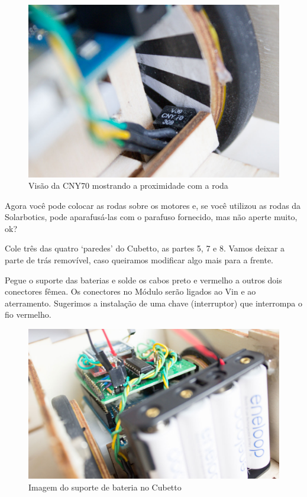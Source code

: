 \documentclass[paper=a4, fontsize=11pt]{scrartcl} %
\numberwithin{equation}{section} %
\numberwithin{figure}{section} %
\numberwithin{table}{section} %
\begin{document}
\begin{figure}[H] %
  \centering
  \includegraphics[scale=0.10]{./imagens/diy-docs-10.jpg}
  \caption[ ]{Visão da CNY70 mostrando a proximidade com a roda }
  \label{fig:cny70 no cubetto perto}
\end{figure}

Agora você pode colocar as rodas sobre os motores e, se você utilizou as rodas da Solarbotics, pode aparafusá-las com o parafuso fornecido, mas não aperte muito, ok?

Cole três das quatro ‘paredes' do Cubetto, as partes 5, 7 e 8. Vamos deixar a parte de trás removível, caso queiramos modificar algo mais para a frente.

Pegue o suporte das baterias e solde os cabos preto e vermelho a outros dois conectores fêmea. Os conectores no Módulo serão ligados ao Vin e ao aterramento. Sugerimos a instalação de uma chave (interruptor) que interrompa o fio vermelho.

\begin{figure}[h] %
  \centering
  \includegraphics[scale=0.10]{./imagens/diy-docs-13.jpg}
  \caption[ ]{Imagem do suporte de bateria no Cubetto }
  \label{fig:bateria no cubetto}
\end{figure}
\end{document}

